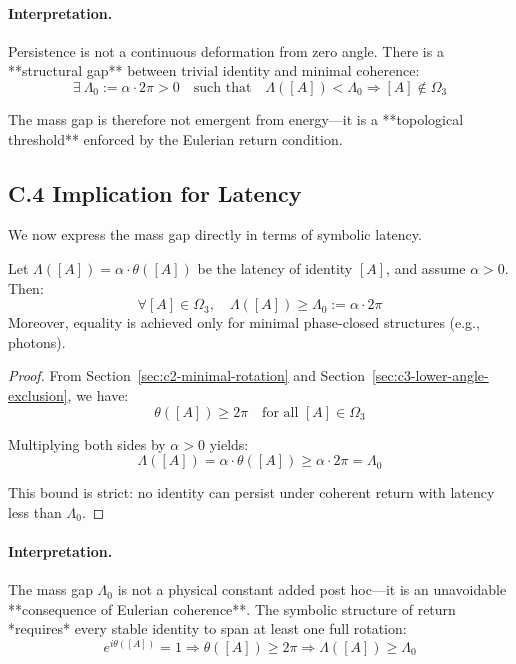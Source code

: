 \paragraph{Interpretation.}
Persistence is not a continuous deformation from zero angle. There is a **structural gap** between trivial identity and minimal coherence:
\[
\exists\ \Lambda_0 := \alpha \cdot 2\pi > 0
\quad \text{such that} \quad
\Lambda([A]) < \Lambda_0 \Rightarrow [A] \notin \Omega_3
\]

The mass gap is therefore not emergent from energy—it is a **topological threshold** enforced by the Eulerian return condition.

\subsection*{C.4 \quad Implication for Latency}
\label{sec:c4-latency-implication}

We now express the mass gap directly in terms of symbolic latency.

\begin{theorem}
Let $\Lambda([A]) = \alpha \cdot \theta([A])$ be the latency of identity $[A]$, and assume $\alpha > 0$. Then:
\[
\forall [A] \in \Omega_3, \quad \Lambda([A]) \geq \Lambda_0 := \alpha \cdot 2\pi
\]
Moreover, equality is achieved only for minimal phase-closed structures (e.g., photons).
\end{theorem}

\begin{proof}
From Section~\ref{sec:c2-minimal-rotation} and Section~\ref{sec:c3-lower-angle-exclusion}, we have:
\[
\theta([A]) \geq 2\pi \quad \text{for all } [A] \in \Omega_3
\]

Multiplying both sides by $\alpha > 0$ yields:
\[
\Lambda([A]) = \alpha \cdot \theta([A]) \geq \alpha \cdot 2\pi = \Lambda_0
\]

This bound is strict: no identity can persist under coherent return with latency less than $\Lambda_0$.

\end{proof}

\paragraph{Interpretation.}
The mass gap $\Lambda_0$ is not a physical constant added post hoc—it is an unavoidable **consequence of Eulerian coherence**. The symbolic structure of return *requires* every stable identity to span at least one full rotation:
\[
e^{i\theta([A])} = 1 \Rightarrow \theta([A]) \geq 2\pi \Rightarrow \Lambda([A]) \geq \Lambda_0
\]

